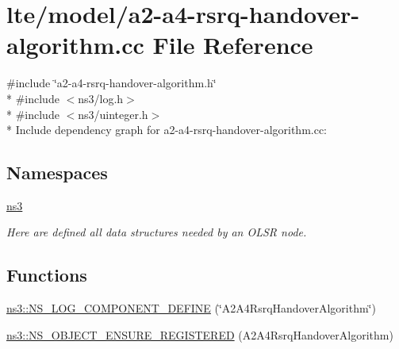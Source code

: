 \hypertarget{a2-a4-rsrq-handover-algorithm_8cc}{}\section{lte/model/a2-\/a4-\/rsrq-\/handover-\/algorithm.cc File Reference}
\label{a2-a4-rsrq-handover-algorithm_8cc}
{\ttfamily \#include \char`\"{}a2-\/a4-\/rsrq-\/handover-\/algorithm.\+h\char`\"{}}\\*
{\ttfamily \#include $<$ns3/log.\+h$>$}\\*
{\ttfamily \#include $<$ns3/uinteger.\+h$>$}\\*
Include dependency graph for a2-\/a4-\/rsrq-\/handover-\/algorithm.cc\+:
\subsection*{Namespaces}
\begin{DoxyCompactItemize}
\item 
 \hyperlink{namespacens3}{ns3}
\begin{DoxyCompactList}\small\item\em Here are defined all data structures needed by an O\+L\+SR node. \end{DoxyCompactList}\end{DoxyCompactItemize}
\subsection*{Functions}
\begin{DoxyCompactItemize}
\item 
\hyperlink{namespacens3_acd424d02061730ede3886cffb8f1f71f}{ns3\+::\+N\+S\+\_\+\+L\+O\+G\+\_\+\+C\+O\+M\+P\+O\+N\+E\+N\+T\+\_\+\+D\+E\+F\+I\+NE} (\char`\"{}A2\+A4\+Rsrq\+Handover\+Algorithm\char`\"{})
\item 
\hyperlink{namespacens3_ac8691c66b9028850e782114feac28797}{ns3\+::\+N\+S\+\_\+\+O\+B\+J\+E\+C\+T\+\_\+\+E\+N\+S\+U\+R\+E\+\_\+\+R\+E\+G\+I\+S\+T\+E\+R\+ED} (A2\+A4\+Rsrq\+Handover\+Algorithm)
\end{DoxyCompactItemize}

